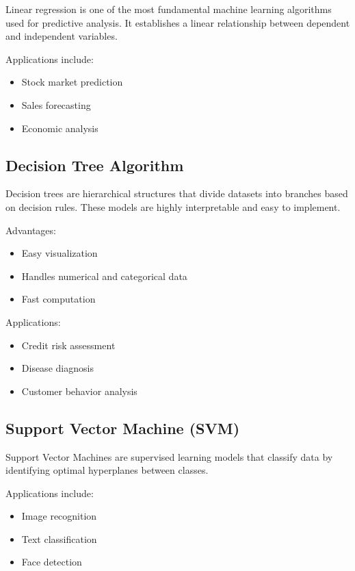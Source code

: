 \documentclass[11pt,a4paper]{article}
\begin{document}
Linear regression is one of the most fundamental machine learning algorithms used for predictive analysis. It establishes a linear relationship between dependent and independent variables.

Applications include:
\begin{itemize}
    \item Stock market prediction
    \item Sales forecasting
    \item Economic analysis
\end{itemize}

\subsection{Decision Tree Algorithm}

Decision trees are hierarchical structures that divide datasets into branches based on decision rules. These models are highly interpretable and easy to implement.

Advantages:
\begin{itemize}
    \item Easy visualization
    \item Handles numerical and categorical data
    \item Fast computation
\end{itemize}

Applications:
\begin{itemize}
    \item Credit risk assessment
    \item Disease diagnosis
    \item Customer behavior analysis
\end{itemize}

\subsection{Support Vector Machine (SVM)}

Support Vector Machines are supervised learning models that classify data by identifying optimal hyperplanes between classes.

Applications include:
\begin{itemize}
    \item Image recognition
    \item Text classification
    \item Face detection
\end{itemize}
\end{document}
